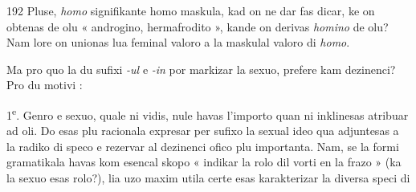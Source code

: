 \begin{VUpage}[196]{192}
Pluse, \textit{homo} signifikante homo maskula, kad on ne dar\cc
fas dicar, ke on obtenas de olu « androgino, hermafrodito »,\nl
kande on derivas \textit{homino} de olu? Nam lore on unionas lua\nl
feminal valoro a la maskulal valoro di \textit{homo}.

Ma pro quo la du sufixi \textit{-ul} e \textit{-in} por markizar la sexuo,\nl
prefere kam dezinenci? Pro du motivi :

1\textsuperscript{e}. Genro e sexuo, quale ni vidis, nule havas l'importo\nl
quan ni inklinesas atribuar ad oli. Do esas plu racionala\nl
expresar per sufixo la sexual ideo qua adjuntesas a la radiko\nl
di speco e rezervar al dezinenci ofico plu importanta. Nam,\nl
se la formi gramatikala havas kom esencal skopo « indikar\nl
la rolo dil vorti en la frazo » (ka la sexuo esas rolo?), lia\nl
uzo maxim utila certe esas karakterizar la diversa speci di\parplein
\end{VUpage}


